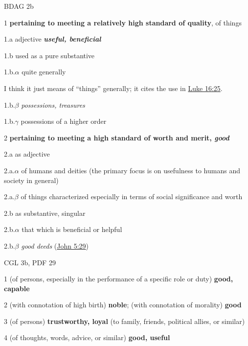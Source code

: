 				\begin{compactdesc}
					\item[BDAG 2b] \textbf{}
						\begin{compactitem}
							\item[1] \textbf{pertaining to meeting a relatively high standard of quality}, of things
							\item[1.a] adjective \textbf{\textit{useful, beneficial}}
							\item[1.b] used as a pure substantive
							\item[1.b.$\alpha$] quite generally 
								\begin{compactitem}
									\item I think it just means of ``things'' generally; it cites the use in \hyperref[LUKE-16-25]{Luke 16:25}.
								\end{compactitem}
							\item[1.b.$\beta$] \textit{possessions, treasures}
							\item[1.b.$\gamma$] possessions of a higher order
							\item[2] \textbf{pertaining to meeting a high standard of worth and merit, \textit{good}}
							\item[2.a] as adjective
							\item[2.a.$\alpha$] of humans and deities (the primary focus is on usefulness to humans and society in general)
							\item[2.a.$\beta$] of things characterized especially in terms of social significance and worth
							\item[2.b] as substantive, singular
							\item[2.b.$\alpha$] that which is beneficial or helpful
							\item[2.b.$\beta$]  \textit{good deeds} (\hyperref[JOHN-5-29]{John 5:29})
						\end{compactitem}
					\item[CGL 3b, PDF 29] \textbf{}
						\begin{compactitem}
							\item[1] (of persons, especially in the performance of a specific role or duty) \textbf{good, capable}
							\item[2] (with connotation of high birth) \textbf{noble}; (with connotation of morality) \textbf{good}
							\item[3] (of persons) \textbf{trustworthy, loyal} (to family, friends, political allies, or similar)
							\item[4] (of thoughts, words, advice, or similar) \textbf{good, useful}

\end{compactitem}
\end{compactdesc}

